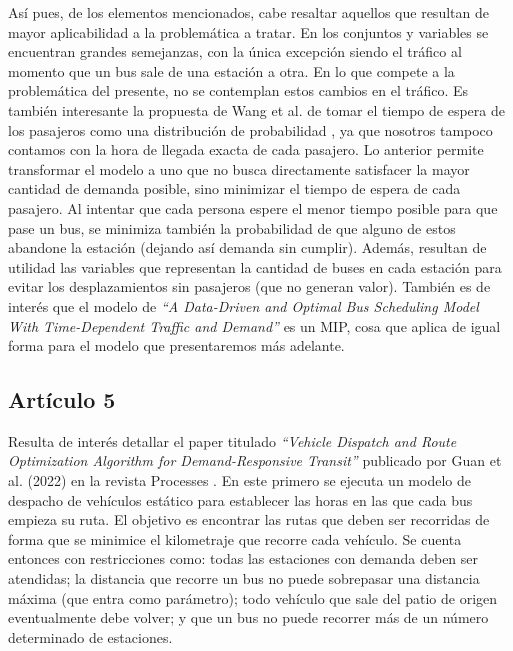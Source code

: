 \documentclass[preprint,11pt]{elsarticle}
\begin{document}
Así pues, de los elementos mencionados, cabe resaltar aquellos que resultan de mayor aplicabilidad a la problemática a tratar. En los conjuntos y variables se encuentran grandes semejanzas, con la única excepción siendo el tráfico al momento que un bus sale de una estación a otra. En lo que compete a la problemática del presente, no se contemplan estos cambios en el tráfico. Es también interesante la propuesta de Wang et al. de tomar el tiempo de espera de los pasajeros como una distribución de probabilidad \parencite{wang2017}, ya que nosotros tampoco contamos con la hora de llegada exacta de cada pasajero. Lo anterior permite transformar el modelo a uno que no busca directamente satisfacer la mayor cantidad de demanda posible, sino minimizar el tiempo de espera de cada pasajero. Al intentar que cada persona espere el menor tiempo posible para que pase un bus, se minimiza también la probabilidad de que alguno de estos abandone la estación (dejando así demanda sin cumplir). Además, resultan de utilidad las variables que representan la cantidad de buses en cada estación para evitar los desplazamientos sin pasajeros (que no generan valor). También es de interés que el modelo de \textit{“A Data-Driven and Optimal Bus Scheduling Model With Time-Dependent Traffic and Demand”} es un MIP, cosa que aplica de igual forma para el modelo que presentaremos más adelante.


\subsection*{Artículo 5}

Resulta de interés detallar el paper titulado \textit{“Vehicle Dispatch and Route Optimization Algorithm for Demand-Responsive Transit”} publicado por Guan et al. (2022) en la revista Processes \parencite{guan2022}. En este primero se ejecuta un modelo de despacho de vehículos estático para establecer las horas en las que cada bus empieza su ruta. El objetivo es encontrar las rutas que deben ser recorridas de forma que se minimice el kilometraje que recorre cada vehículo. Se cuenta entonces con restricciones como: todas las estaciones con demanda deben ser atendidas; la distancia que recorre un bus no puede sobrepasar una distancia máxima (que entra como parámetro); todo vehículo que sale del patio de origen eventualmente debe volver; y que un bus no puede recorrer más de un número determinado de estaciones. 
\end{document}
